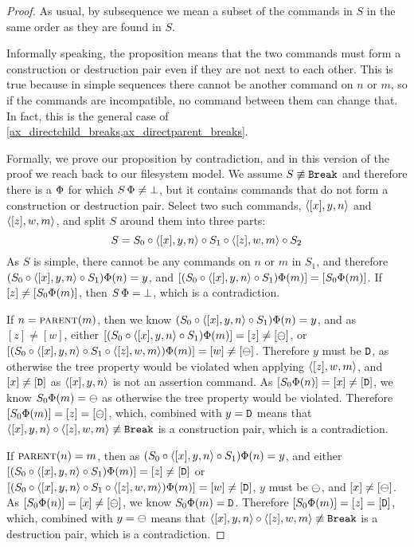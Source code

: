 \begin{proof}
As usual, by subsequence we mean a subset of the commands in $S$ in the same order as they are found in $S$.

Informally speaking, the proposition means that
the two commands must form a construction or destruction pair even
if they are not next to each other.
This is true because in simple sequences
there cannot be another command on $n$ or $m$,
so if the commands are incompatible, no command between them can change that.
In fact, this  is the general case
of \cref{ax_directchild_breaks,ax_directparent_breaks}.

Formally, we prove our proposition by contradiction,
and in this version of the proof we reach back to our filesystem model.
We assume $S\not\equiv\mathtt{Break}$ and therefore there is a $\Phi$ for which $S\,\Phi\neq\bot$,
but it contains commands that do not form a construction or destruction pair.
Select two such commands, $\langle{[x],y,n}\rangle$ and $\langle{[z],w,m}\rangle$,
and split $S$ around them into three parts:
\[ S = S_0 \circ \langle{[x],y,n}\rangle \circ S_1 \circ \langle{[z],w,m}\rangle \circ S_2 \]
As $S$ is simple, there cannot be any commands on $n$ or $m$ in $S_1$,
and therefore $(S_0\circ\langle{[x],y,n}\rangle\circ S_1)\Phi(n) = y$,
and $[(S_0\circ\langle{[x],y,n}\rangle\circ S_1)\Phi(m)] = [S_0\Phi(m)]$.
If $[z]\neq[S_0\Phi(m)]$, then $S\,\Phi=\bot$, which is a contradiction.

If $n=\text{\normalfont\scshape{parent}}(m)$, then 
we know $(S_0\circ\langle{[x],y,n}\rangle\circ S_1)\Phi(n) = y$, and as $[z]\neq[w]$, either
$[(S_0\circ\langle{[x],y,n}\rangle\circ S_1)\Phi(m)]=[z]\neq[\ominus]$,
or $[(S_0\circ\langle{[x],y,n}\rangle\circ S_1\circ\langle{[z],w,m}\rangle)\Phi(m)]=[w]\neq[\ominus]$.
Therefore $y$ must be $\mathtt{D}$, as otherwise the tree property would be violated
when applying $\langle{[z],w,m}\rangle$,
and $[x]\neq[\mathtt{D}]$ as $\langle{[x],y,n}\rangle$ is not an assertion command.
As $[S_0\Phi(n)]=[x]\neq[\mathtt{D}]$, we know
$S_0\Phi(m)=\ominus$ as otherwise the tree property would be violated.
Therefore $[S_0\Phi(m)]=[z]=[\ominus]$, which, combined with $y=\mathtt{D}$
means that $\langle{[x],y,n}\rangle\circ\langle{[z],w,m}\rangle\not\equiv\mathtt{Break}$ is a construction pair, which is a contradiction.

If $\text{\normalfont\scshape{parent}}(n)=m$, then 
as $(S_0\circ\langle{[x],y,n}\rangle\circ S_1)\Phi(n) = y$, and either
$[(S_0\circ\langle{[x],y,n}\rangle\circ S_1)\Phi(m)]=[z]\neq[\mathtt{D}]$
or $[(S_0\circ\langle{[x],y,n}\rangle\circ S_1\circ\langle{[z],w,m}\rangle)\Phi(m)]=[w]\neq[\mathtt{D}]$,
$y$ must be $\ominus$, and $[x]\neq[\ominus]$.
As $[S_0\Phi(n)]=[x]\neq[\ominus]$, we know $S_0\Phi(m)=\mathtt{D}$.
Therefore $[S_0\Phi(m)]=[z]=[\mathtt{D}]$, which, combined with $y=\ominus$
means that $\langle{[x],y,n}\rangle\circ\langle{[z],w,m}\rangle\not\equiv\mathtt{Break}$ is a destruction pair, which is a contradiction.
\end{proof}


